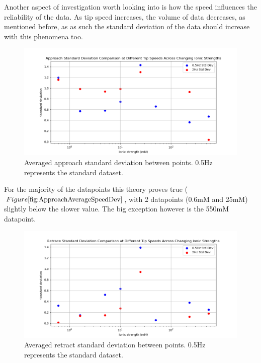 Another aspect of investigation worth looking into is how the speed influences the reliability of the data. As tip speed increases, the volume of data decreases, as mentioned before, as as such the standard deviation of the data should increase with this phenomena too.

\begin{figure}[h!]
\centering
\includegraphics[width=\textwidth]{chapter7/Tip speed/Standard deviation change.png}
\caption{Averaged approach standard deviation between points. 0.5Hz represents the standard dataset.}
\label{fig:ApproachAverageSpeedDev}
\end{figure}

For the majority of the datapoints this theory proves true ($Figure \ref{fig:ApproachAverageSpeedDev}$, with 2 datapoints (0.6mM and 25mM) slightly below the slower value. The big exception however is the 550mM datapoint.

\begin{figure}[h!!!]
\centering
\includegraphics[width=\textwidth]{chapter7/Tip speed/Standard deviation change retract.png}
\caption{Averaged retract standard deviation between points. 0.5Hz represents the standard dataset.}
\label{fig:RetractAverageSpeedDev}
\end{figure}

